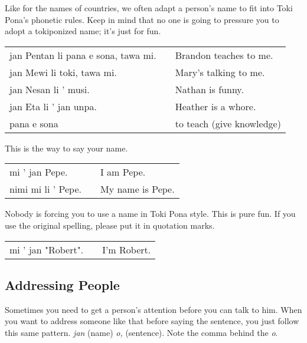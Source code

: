 Like for the names of countries, we often adapt a person's name to fit into Toki Pona's phonetic rules.
Keep in mind that no one is going to pressure you to adopt a tokiponized name; it's just for fun.

\begin{supertabular}{p{5,5cm}|ll}
    jan Pentan li pana e sona, tawa mi. &  & Brandon teaches to me.    \\
    jan Mewi li toki, tawa mi.          &  & Mary's talking to me.     \\
    jan Nesan li ' musi.                &  & Nathan is funny.          \\
    jan Eta li ' jan unpa.              &  & Heather is a whore.       \\
    pana e sona                         &  & to teach (give knowledge) \\
\end{supertabular}

This is the way to say your name.

\begin{supertabular}{p{5,5cm}|ll}
    mi ' jan Pepe.     &  & I am Pepe.       \\
    nimi mi li ' Pepe. &  & My name is Pepe.
\end{supertabular}

Nobody is forcing you to use a name in Toki Pona style.
This is pure fun.
If you use the original spelling, please put it in quotation marks.

\begin{supertabular}{p{5,5cm}|ll}
    mi ' jan "Robert". &  & I'm Robert. \\
\end{supertabular}
%
\subsection*{Addressing People}
%
Sometimes you need to get a person's attention before you can talk to him.
When you want to address someone like that before saying the sentence, you just follow this same pattern.
\textit{jan} (name) \textit{o,} (sentence).
Note the comma behind the \textit{o}.

